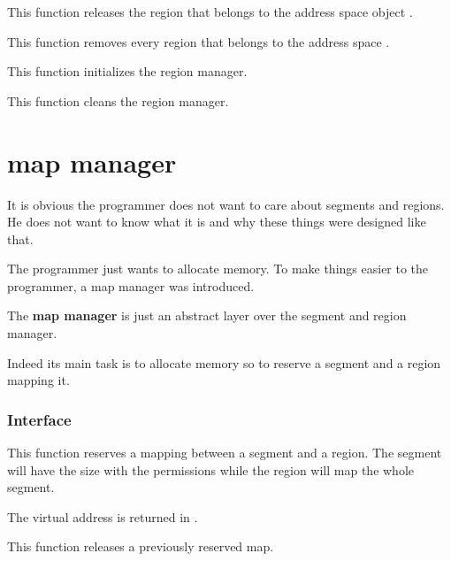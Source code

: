 	 {
	   This function releases the region  that belongs
	   to the address space object .
	 }

	 {
	   This function removes every region that belongs to the
	   address space .
	 }

	 {
	   This function initializes the region manager.
	 }

	 {
	   This function cleans the region manager.
	 }

%
%

\section{map manager}

It is obvious the programmer does not want to care about segments and
regions. He does not want to know what it is and why these things were
designed like that.

The programmer just wants to allocate memory. To make things easier
to the programmer, a map manager was introduced.

The \textbf{map manager} is just an abstract layer over the segment
and region manager.

Indeed its main task is to allocate memory so to reserve a segment
and a region mapping it.

%
%

\subsubsection{Interface}

	 {
	   This function reserves a mapping between a segment and a region.
	   The segment will have the size  with the permissions
	    while the region will map the whole segment.

	   The virtual address is returned in .
	 }

	 {
	   This function releases a previously reserved map.
	 }

